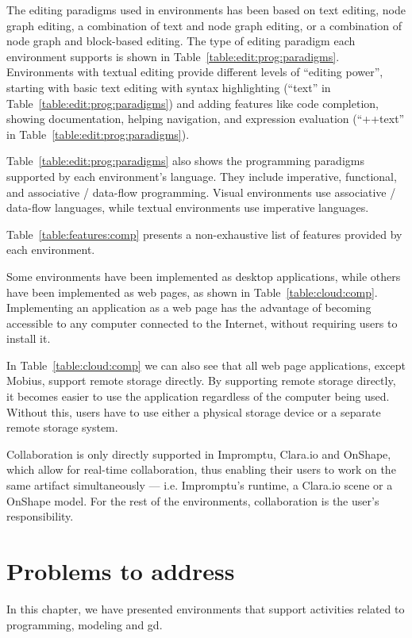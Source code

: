The editing paradigms used in environments has been based on text editing, node graph editing, a combination of text and node graph editing, or a combination of node graph and block-based editing.
The type of editing paradigm each environment supports is shown in Table~\ref{table:edit:prog:paradigms}.
Environments with textual editing provide different levels of ``editing power'', starting with basic text editing with syntax highlighting (``text'' in Table~\ref{table:edit:prog:paradigms}) and adding features like code completion, showing documentation, helping navigation, and expression evaluation (``++text'' in Table~\ref{table:edit:prog:paradigms}).

Table~\ref{table:edit:prog:paradigms} also shows the programming paradigms supported by each environment's language.
They include imperative, functional, and associative / data-flow programming.
Visual environments use associative / data-flow languages, while textual environments use imperative languages.

Table~\ref{table:features:comp} presents a non-exhaustive list of features provided by each environment.

Some environments have been implemented as desktop applications, while others have been implemented as web pages, as shown in Table~\ref{table:cloud:comp}.
Implementing an application as a web page has the advantage of becoming accessible to any computer connected to the Internet, without requiring users to install it.

In Table~\ref{table:cloud:comp} we can also see that all web page applications, except Mobius, support remote storage directly.
By supporting remote storage directly, it becomes easier to use the application regardless of the computer being used.
Without this, users have to use either a physical storage device or a separate remote storage system.

Collaboration is only directly supported in Impromptu, Clara.io and OnShape, which allow for real-time collaboration, thus enabling their users to work on the same artifact simultaneously --- i.e. Impromptu's runtime, a Clara.io scene or a OnShape model.
For the rest of the environments, collaboration is the user's responsibility.


\section{Problems to address}
In this chapter, we have presented environments that support activities related to programming, modeling and \gls{gd}.

